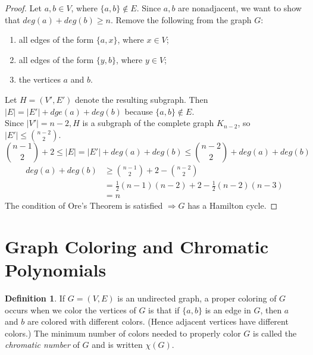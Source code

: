 \documentclass[letter]{book}
\theoremstyle{definition}
\theoremstyle{definition}
\newtheorem{mydef}{Definition}[chapter]
\theoremstyle{remark}
\begin{document}
\begin{proof}
    Let $a,b\in V$, where $\{a,b\}\notin E$. Since $a,b$ are nonadjacent, we want to show that $deg(a)+deg(b)\geq n$. Remove the following from the graph $G$:
    \begin{enumerate}[label=i)]
        \item all edges of the form $\{a,x\}$, where $x\in V$;
        \item all edges of the form $\{y,b\}$, where $y\in V$;
        \item the vertices $a$ and $b$.
    \end{enumerate}
    Let $H=(V',E')$ denote the resulting subgraph. Then $|E|=|E'|+dge(a)+deg(b)$ because $\{a,b\}\notin E$.\\
    Since $|V'|=n-2, H$ is a subgraph of the complete graph $K_{n-2}$, so $|E'|\leq \binom{n-2}{2}$.
    \begin{equation*}
        \binom{n-1}{2}+2\leq |E|=|E'|+deg(a)+deg(b)\leq \binom{n-2}{2}+deg(a)+deg(b)
    \end{equation*}
    \begin{align*}
        deg(a)+deg(b)&\geq \binom{n-1}{2}+2-\binom{n-2}{2}\\
        &=\frac{1}{2}(n-1)(n-2)+2-\frac{1}{2}(n-2)(n-3)\\
        &=n
    \end{align*}
    The condition of Ore's Theorem is satisfied $\Rightarrow G$ has a Hamilton cycle.
\end{proof}
\section{Graph Coloring and Chromatic Polynomials}
\begin{mydef}
    If $G=(V,E)$ is an undirected graph, a proper coloring of $G$ occurs when we color the vertices of $G$ is that if $\{a,b\}$ is an edge in $G$, then $a$ and $b$ are colored with different colors. (Hence adjacent vertices have different colors.) The minimum number of colors needed to properly color $G$ is called the \textit{chromatic number} of $G$ and is written $\chi(G)$.
\end{mydef}
\end{document}
